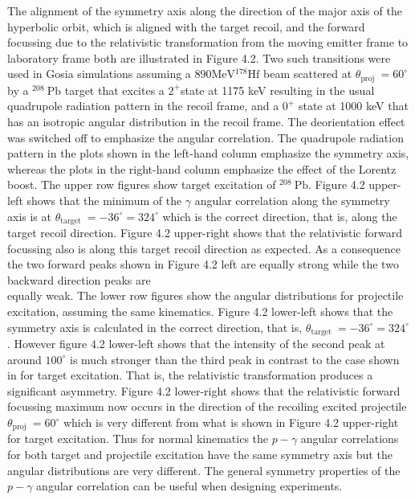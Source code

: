 \documentclass[10pt]{article}
\begin{document}
The alignment of the symmetry axis along the direction of the major axis of the hyperbolic orbit, which is aligned with the target recoil, and the forward focussing due to the relativistic transformation from the moving emitter frame to laboratory frame both are illustrated in Figure 4.2. Two such transitions were used in Gosia simulations assuming a $890 \mathrm{MeV}{ }^{178} \mathrm{Hf}$ beam scattered at $\theta_{\text {proj }}=60^{\circ}$ by a ${ }^{208} \mathrm{~Pb}$ target that excites a $2^{+}$state at 1175 keV resulting in the usual quadrupole radiation pattern in the recoil frame, and a $0^{+}$ state at 1000 keV that has an isotropic angular distribution in the recoil frame. The deorientation effect was switched off to emphasize the angular correlation. The quadrupole radiation pattern in the plots shown in the left-hand column emphasize the symmetry axis, whereas the plots in the right-hand column emphasize the effect of the Lorentz boost. The upper row figures show target excitation of ${ }^{208} \mathrm{~Pb}$. Figure 4.2 upper-left shows that the minimum of the $\gamma$ angular correlation along the symmetry axis is at $\theta_{\text {target }}=-36^{\circ}=324^{\circ}$ which is the correct direction, that is, along the target recoil direction. Figure 4.2 upper-right shows that the relativistic forward focussing also is along this target recoil direction as expected. As a consequence the two forward peaks shown in Figure 4.2 left are equally strong while the two backward direction peaks are\\
equally weak. The lower row figures show the angular distributions for projectile excitation, assuming the same kinematics. Figure 4.2 lower-left shows that the symmetry axis is calculated in the correct direction, that is, $\theta_{\text {target }}=-36^{\circ}=324^{\circ}$. However figure 4.2 lower-left shows that the intensity of the second peak at around $100^{\circ}$ is much stronger than the third peak in contrast to the case shown in for target excitation. That is, the relativistic transformation produces a significant asymmetry. Figure 4.2 lower-right shows that the relativistic forward focussing maximum now occurs in the direction of the recoiling excited projectile $\theta_{\text {proj }}=60^{\circ}$ which is very different from what is shown in Figure 4.2 upper-right for target excitation. Thus for normal kinematics the $p-\gamma$ angular correlations for both target and projectile excitation have the same symmetry axis but the angular distributions are very different. The general symmetry properties of the $p-\gamma$ angular correlation can be useful when designing experiments.
\end{document}
